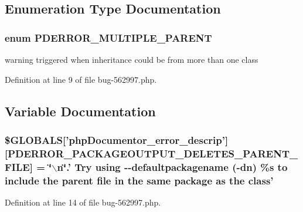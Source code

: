 \subsection{\-Enumeration \-Type \-Documentation}
\hypertarget{bug-562997_8php_aa4067eef2227b444cee399368374b6cf}{
\subsubsection[{\-P\-D\-E\-R\-R\-O\-R\-\_\-\-M\-U\-L\-T\-I\-P\-L\-E\-\_\-\-P\-A\-R\-E\-N\-T}]{\setlength{\rightskip}{0pt plus 5cm}enum {\bf \-P\-D\-E\-R\-R\-O\-R\-\_\-\-M\-U\-L\-T\-I\-P\-L\-E\-\_\-\-P\-A\-R\-E\-N\-T}}}\label{bug-562997_8php_aa4067eef2227b444cee399368374b6cf}
warning triggered when inheritance could be from more than one class 

\-Definition at line 9 of file bug-\/562997.\-php.



\subsection{\-Variable \-Documentation}
\hypertarget{bug-562997_8php_aaa6a277368deecb0948f5287d6e05ba3}{
\subsubsection[{\$\-G\-L\-O\-B\-A\-L\-S}]{\setlength{\rightskip}{0pt plus 5cm}\$\-G\-L\-O\-B\-A\-L\-S\mbox{[}'php\-Documentor\-\_\-error\-\_\-descrip'\mbox{]}\mbox{[}{\bf \-P\-D\-E\-R\-R\-O\-R\-\_\-\-P\-A\-C\-K\-A\-G\-E\-O\-U\-T\-P\-U\-T\-\_\-\-D\-E\-L\-E\-T\-E\-S\-\_\-\-P\-A\-R\-E\-N\-T\-\_\-\-F\-I\-L\-E}\mbox{]} = \char`\"{}$\backslash$n\char`\"{}.' \-Try using -\/-\/defaultpackagename (-\/dn) \%s to include the parent file in the same package as the class'}}\label{bug-562997_8php_aaa6a277368deecb0948f5287d6e05ba3}


\-Definition at line 14 of file bug-\/562997.\-php.

